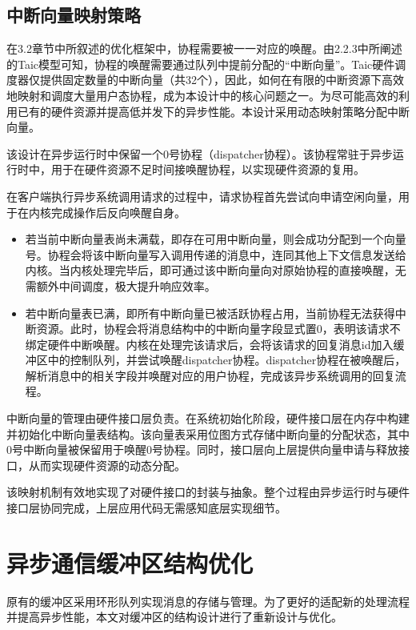 \subsection{中断向量映射策略}\label{sec:intrdesign}

在3.2章节中所叙述的优化框架中，协程需要被一一对应的唤醒。由2.2.3中所阐述的Taic模型可知，协程的唤醒需要通过队列中提前分配的“中断向量”。Taic硬件调度器仅提供固定数量的中断向量（共32个），因此，如何在有限的中断资源下高效地映射和调度大量用户态协程，成为本设计中的核心问题之一。为尽可能高效的利用已有的硬件资源并提高低并发下的异步性能。本设计采用动态映射策略分配中断向量\cite{2013IRQAlloc}。

该设计在异步运行时中保留一个0号协程（dispatcher协程）。该协程常驻于异步运行时中，用于在硬件资源不足时间接唤醒协程，以实现硬件资源的复用。

在客户端执行异步系统调用请求的过程中，请求协程首先尝试向申请空闲向量，用于在内核完成操作后反向唤醒自身。

\begin{itemize}
  \item 若当前中断向量表尚未满载，即存在可用中断向量，则会成功分配到一个向量号。协程会将该中断向量写入调用传递的消息中，连同其他上下文信息发送给内核。当内核处理完毕后，即可通过该中断向量向对原始协程的直接唤醒，无需额外中间调度，极大提升响应效率。

  \item 若中断向量表已满，即所有中断向量已被活跃协程占用，当前协程无法获得中断资源。此时，协程会将消息结构中的中断向量字段显式置0，表明该请求不绑定硬件中断唤醒。内核在处理完该请求后，会将该请求的回复消息id加入缓冲区中的控制队列，并尝试唤醒dispatcher协程。dispatcher协程在被唤醒后，解析消息中的相关字段并唤醒对应的用户协程，完成该异步系统调用的回复流程。
\end{itemize}

中断向量的管理由硬件接口层负责。在系统初始化阶段，硬件接口层在内存中构建并初始化中断向量表结构。该向量表采用位图方式存储中断向量的分配状态，其中0号中断向量被保留用于唤醒0号协程。同时，接口层向上层提供向量申请与释放接口，从而实现硬件资源的动态分配。

该映射机制有效地实现了对硬件接口的封装与抽象。整个过程由异步运行时与硬件接口层协同完成，上层应用代码无需感知底层实现细节。

\section{异步通信缓冲区结构优化}\label{sec:buffer}

原有的缓冲区采用环形队列实现消息的存储与管理。为了更好的适配新的处理流程并提高异步性能，本文对缓冲区的结构设计进行了重新设计与优化。

